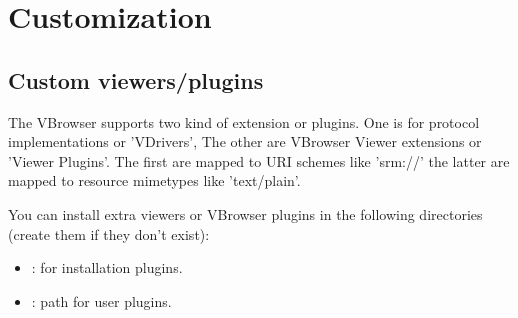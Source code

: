 %
%

\chapter{Customization}
\label{chap:customization}

\section{Custom viewers/plugins}

The VBrowser supports two kind of extension or plugins. One is for protocol 
implementations or 'VDrivers', The other are VBrowser Viewer extensions or
'Viewer Plugins'. The first are mapped to URI schemes like 'srm://' the latter
are mapped to resource mimetypes like 'text/plain'. \\
\par
You can install extra viewers or VBrowser plugins in the following directories 
(create them if they don't exist):

\begin{itemize}
  \item {}: for installation plugins.
    \item {}: path for user plugins.
\end{itemize}

